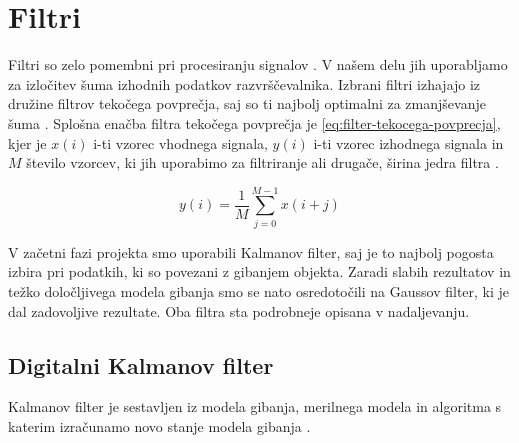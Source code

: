 \section{Filtri}\label{sec:filtri}
Filtri so zelo pomembni pri procesiranju signalov \cite{smith1997scientist}. V našem delu jih uporabljamo za izločitev šuma izhodnih podatkov razvrščevalnika. Izbrani filtri izhajajo iz družine filtrov tekočega povprečja, saj so ti najbolj optimalni za zmanjševanje šuma \cite{smith1997scientist}. Splošna enačba filtra tekočega povprečja je \eqref{eq:filter-tekocega-povprecja}, kjer je $x(i)$ i-ti vzorec vhodnega signala, $y(i)$ i-ti vzorec izhodnega signala in $M$ število vzorcev, ki jih uporabimo za filtriranje ali drugače, širina jedra filtra \cite{smith1997scientist}.

\begin{equation}
y(i) = \frac{1}{M} \sum_{j=0}^{M-1} x(i + j)
\label{eq:filter-tekocega-povprecja}
\end{equation}

V začetni fazi projekta smo uporabili Kalmanov filter, saj je to najbolj pogosta izbira pri podatkih, ki so povezani z gibanjem objekta. Zaradi slabih rezultatov in težko določljivega modela gibanja smo se nato osredotočili na Gaussov filter, ki je dal zadovoljive rezultate. Oba filtra sta podrobneje opisana v nadaljevanju.





\subsection{Digitalni Kalmanov filter}\label{sec:kalmanov-filter}
Kalmanov filter je sestavljen iz modela gibanja, merilnega modela in algoritma s katerim izračunamo novo stanje modela gibanja \cite{trucco1998introductory}.


